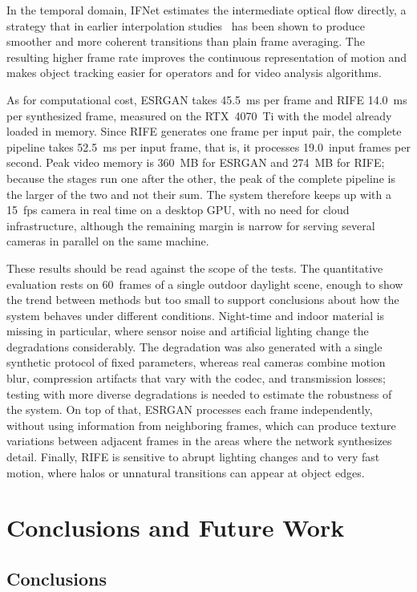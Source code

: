 \documentclass[conference]{IEEEtran}
\begin{document}
In the temporal domain, IFNet estimates the intermediate optical flow directly, a strategy that in earlier interpolation studies~\cite{jiang2018superslomo, bao2019dain} has been shown to produce smoother and more coherent transitions than plain frame averaging. The resulting higher frame rate improves the continuous representation of motion and makes object tracking easier for operators and for video analysis algorithms.

As for computational cost, ESRGAN takes 45.5~ms per frame and RIFE 14.0~ms per synthesized frame, measured on the RTX~4070~Ti with the model already loaded in memory. Since RIFE generates one frame per input pair, the complete pipeline takes 52.5~ms per input frame, that is, it processes 19.0~input frames per second. Peak video memory is 360~MB for ESRGAN and 274~MB for RIFE; because the stages run one after the other, the peak of the complete pipeline is the larger of the two and not their sum. The system therefore keeps up with a 15~fps camera in real time on a desktop GPU, with no need for cloud infrastructure, although the remaining margin is narrow for serving several cameras in parallel on the same machine.

These results should be read against the scope of the tests. The quantitative evaluation rests on 60~frames of a single outdoor daylight scene, enough to show the trend between methods but too small to support conclusions about how the system behaves under different conditions. Night-time and indoor material is missing in particular, where sensor noise and artificial lighting change the degradations considerably. The degradation was also generated with a single synthetic protocol of fixed parameters, whereas real cameras combine motion blur, compression artifacts that vary with the codec, and transmission losses; testing with more diverse degradations is needed to estimate the robustness of the system. On top of that, ESRGAN processes each frame independently, without using information from neighboring frames, which can produce texture variations between adjacent frames in the areas where the network synthesizes detail. Finally, RIFE is sensitive to abrupt lighting changes and to very fast motion, where halos or unnatural transitions can appear at object edges.

\section{Conclusions and Future Work}

\subsection{Conclusions}
\end{document}
